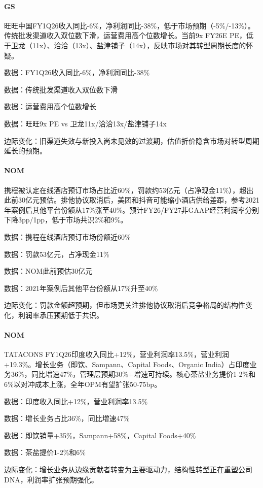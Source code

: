 \documentclass[11pt]{ctexart}
\begin{document}
\paragraph{GS} 旺旺中国FY1Q26收入同比-6\%，净利润同比-38\%，低于市场预期（-5\%/-13\%）。传统批发渠道收入双位数下滑，运营费用高个位数增长。当前9x FY26E PE，低于卫龙（11x）、洽洽（13x）、盐津铺子（14x），反映市场对其转型周期长度的怀疑。
{\small\color{refgray}数据：FY1Q26收入同比-6\%，净利润同比-38\%\par}
{\small\color{refgray}数据：传统批发渠道收入双位数下滑\par}
{\small\color{refgray}数据：运营费用高个位数增长\par}
{\small\color{refgray}数据：旺旺9x PE vs 卫龙11x/洽洽13x/盐津铺子14x\par}
{\small\color{refgray}边际变化：旧渠道失效与新投入尚未见效的过渡期，估值折价隐含市场对转型周期延长的预期。\par}
\paragraph{NOM} 携程被认定在线酒店预订市场占比近60\%，罚款约53亿元（占净现金11\%），超出此前30亿元预估。排他协议取消后，美团和抖音可能缩小酒店供给差距，参考2021年案例后其他平台份额从17\%涨至40\%。预计FY26/FY27非GAAP经营利润率分别下降3pp/1pp，低于市场共识2\%和9\%。
{\small\color{refgray}数据：携程在线酒店预订市场份额近60\%\par}
{\small\color{refgray}数据：罚款53亿元，占净现金11\%\par}
{\small\color{refgray}数据：NOM此前预估30亿元\par}
{\small\color{refgray}数据：2021年案例后其他平台份额从17\%升至40\%\par}
{\small\color{refgray}边际变化：罚款金额超预期，但市场更关注排他协议取消后竞争格局的结构性变化，利润率承压预期低于共识。\par}
\paragraph{NOM} TATACONS FY1Q26印度收入同比+12\%，营业利润率13.5\%，营业利润+19.3\%。增长业务（即饮、Sampann、Capital Foods、Organic India）占印度业务36\%，同比增速47\%，管理层预期30\%+增速可持续。核心茶盐业务提价1-2\%和6\%以对冲成本上涨，全年OPM有望扩张50-75bp。
{\small\color{refgray}数据：印度收入同比+12\%，营业利润率13.5\%\par}
{\small\color{refgray}数据：增长业务占比36\%，同比增速47\%\par}
{\small\color{refgray}数据：即饮销量+35\%，Sampann+58\%，Capital Foods+40\%\par}
{\small\color{refgray}数据：茶盐提价1-2\%和6\%\par}
{\small\color{refgray}边际变化：增长业务从边缘贡献者转变为主要驱动力，结构性转型正在重塑公司DNA，利润率扩张预期强化。\par}
\end{document}

